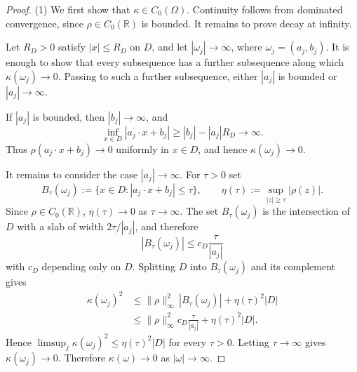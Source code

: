 \documentclass[11pt]{amsart}
\theoremstyle{definition}
\theoremstyle{remark}
\begin{document}
\begin{proof}
(1) We first show that $\kappa \in C_0(\Omega)$. Continuity follows from
dominated convergence, since $\rho \in C_0(\mathbb{R})$ is bounded. It remains
to prove decay at infinity.

Let $R_D>0$ satisfy $|x|\le R_D$ on $D$, and let $|\omega_j| \to \infty$, where
$\omega_j=(a_j,b_j)$. It is enough to show that every subsequence has a further
subsequence along which $\kappa(\omega_j)\to0$. Passing to such a further
subsequence, either $|a_j|$ is bounded or $|a_j|\to\infty$.

If $|a_j|$ is bounded, then $|b_j|\to\infty$, and
\begin{equation*}
	\inf_{x\in D}|a_j\cdot x+b_j|
	\ge |b_j|-|a_j|R_D \to \infty.
\end{equation*}
Thus $\rho(a_j\cdot x+b_j)\to0$ uniformly in $x\in D$, and hence
$\kappa(\omega_j)\to0$.

It remains to consider the case $|a_j|\to\infty$. For $\tau>0$ set
\begin{equation*}
	B_\tau(\omega_j) := \{x\in D: |a_j\cdot x+b_j|\le \tau\}, 
	\qquad
	\eta(\tau) := \sup_{|z|\ge\tau}|\rho(z)|.
\end{equation*}
Since $\rho\in C_0(\mathbb{R})$, $\eta(\tau)\to0$ as $\tau\to\infty$. The set
$B_\tau(\omega_j)$ is the intersection of $D$ with a slab of width
$2\tau/|a_j|$, and therefore
\begin{equation*}
	|B_\tau(\omega_j)| \le c_D\frac{\tau}{|a_j|}
\end{equation*}
with $c_D$ depending only on $D$. Splitting $D$ into $B_\tau(\omega_j)$ and its
complement gives
\begin{equation*}
\begin{aligned}
	\kappa(\omega_j)^2
	&\le \|\rho\|_\infty^2 \, |B_\tau(\omega_j)|
	+ \eta(\tau)^2 |D| \\
	&\le \|\rho\|_\infty^2 c_D\frac{\tau}{|a_j|}
	+ \eta(\tau)^2 |D|.
\end{aligned}
\end{equation*}
Hence $\limsup_j \kappa(\omega_j)^2 \le \eta(\tau)^2 |D|$ for every $\tau>0$.
Letting $\tau\to\infty$ gives $\kappa(\omega_j)\to0$. Therefore
$\kappa(\omega)\to0$ as $|\omega|\to\infty$.


\end{proof}
\end{document}
